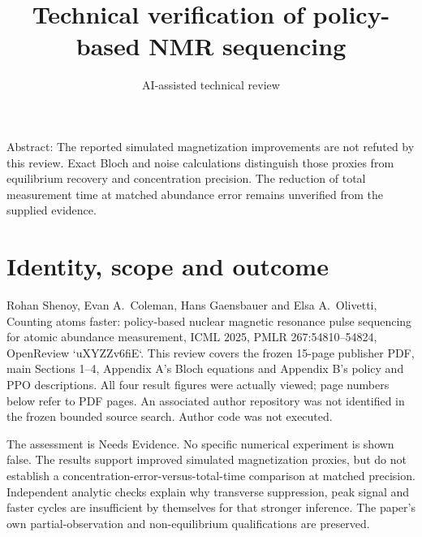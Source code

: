 \documentclass[10pt]{article}
\title{Technical verification of policy-based NMR sequencing}
\author{AI-assisted technical review}
\date{}
\begin{document}
\maketitle
Abstract: The reported simulated magnetization improvements are not refuted by this review. Exact Bloch and noise calculations distinguish those proxies from equilibrium recovery and concentration precision. The reduction of total measurement time at matched abundance error remains unverified from the supplied evidence.\par
\section*{Identity, scope and outcome}
Rohan Shenoy, Evan A. Coleman, Hans Gaensbauer and Elsa A. Olivetti, Counting atoms faster: policy-based nuclear magnetic resonance pulse sequencing for atomic abundance measurement, ICML 2025, PMLR 267:54810–54824, OpenReview `uXYZZv6fiE`. This review covers the frozen 15-page publisher PDF, main Sections 1–4, Appendix A’s Bloch equations and Appendix B’s policy and PPO descriptions. All four result figures were actually viewed; page numbers below refer to PDF pages. An associated author repository was not identified in the frozen bounded source search. Author code was not executed.\par
The assessment is Needs Evidence. No specific numerical experiment is shown false. The results support improved simulated magnetization proxies, but do not establish a concentration-error-versus-total-time comparison at matched precision. Independent analytic checks explain why transverse suppression, peak signal and faster cycles are insufficient by themselves for that stronger inference. The paper’s own partial-observation and non-equilibrium qualifications are preserved.\par
\end{document}
